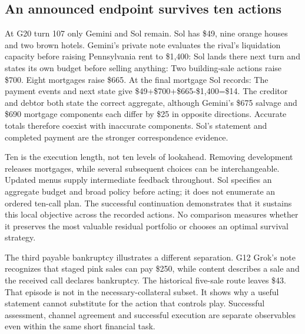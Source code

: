 \subsection{An announced endpoint survives ten actions}
At G20 turn 107 only Gemini and Sol remain. Sol has \$49, nine orange houses and two brown hotels. Gemini's private note evaluates the rival's liquidation capacity before raising Pennsylvania rent to \$1,400:
Sol lands there next turn and states its own budget before selling anything:
Two building-sale actions raise \$700. Eight mortgages raise \$665. At the final mortgage Sol records:
The payment events and next state give \$49+\$700+\$665-\$1,400=\$14. The creditor and debtor both state the correct aggregate, although Gemini's \$675 salvage and \$690 mortgage components each differ by \$25 in opposite directions. Accurate totals therefore coexist with inaccurate components. Sol's statement and completed payment are the stronger correspondence evidence.

Ten is the execution length, not ten levels of lookahead. Removing development releases mortgages, while several subsequent choices can be interchangeable. Updated menus supply intermediate feedback throughout. Sol specifies an aggregate budget and broad policy before acting; it does not enumerate an ordered ten-call plan. The successful continuation demonstrates that it sustains this local objective across the recorded actions. No comparison measures whether it preserves the most valuable residual portfolio or chooses an optimal survival strategy.

The third payable bankruptcy illustrates a different separation. G12 Grok's note recognizes that staged pink sales can pay \$250, while content describes a sale and the received call declares bankruptcy. The historical five-sale route leaves \$43. That episode is not in the necessary-collateral subset. It shows why a useful statement cannot substitute for the action that controls play. Successful assessment, channel agreement and successful execution are separate observables even within the same short financial task.
